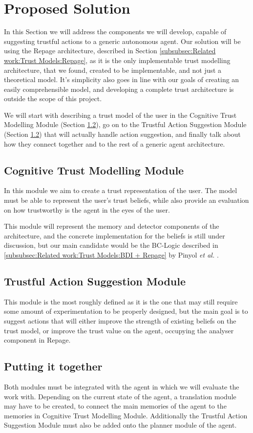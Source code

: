 \section{Proposed Solution}
\label{sec:Solution}
In this Section we will address the components we will develop, capable of suggesting trustful actions to a generic autonomous agent. Our solution will be using the Repage architecture, described in Section \ref{subsubsec:Related work:Trust Models:Repage}, as it is the only implementable trust modelling architecture, that we found, created to be implementable, and not just a theoretical model. It's simplicity also goes in line with our goals of creating an easily comprehensible model, and developing a complete trust architecture is outside the scope of this project.

We will start with describing a trust model of the user in the Cognitive Trust Modelling Module (Section \ref{subsec:Solution:Trust Decision Making Module}), go on to the Trustful Action Suggestion Module (Section \ref{subsec:Solution:Trust Decision Making Module}) that will actually handle action suggestion, and finally talk about how they connect together and to the rest of a generic agent architecture.


\subsection{Cognitive Trust Modelling Module}
\label{subsec:Solution:Trust Assessment Module}
In this module we aim to create a trust representation of the user. The model must be able to represent the user's trust beliefs, while also provide an evaluation on how trustworthy is the agent in the eyes of the user. 

This module will represent the memory and detector components of the architecture, and the concrete implementation for the beliefs is still under discussion, but our main candidate would be the BC-Logic described in \ref{subsubsec:Related work:Trust Models:BDI + Repage} by Pinyol \textit{et al.} \cite{Pinyol2009}.

\subsection{Trustful Action Suggestion Module}
\label{subsec:Solution:Trust Decision Making Module}
This module is the most roughly defined as it is the one that may still require some amount of experimentation to be properly designed, but the main goal is to suggest actions that will either improve the strength of existing beliefs on the trust model, or improve the trust value on the agent, occupying the analyser component in Repage.

\subsection{Putting it together}
Both modules must be integrated with the agent in which we will evaluate the work with. Depending on the current state of the agent, a translation module may have to be created, to connect the main memories of the agent to the memories in Cognitive Trust Modelling Module. Additionally the Trustful Action Suggestion Module must also be added onto the planner module of the agent.